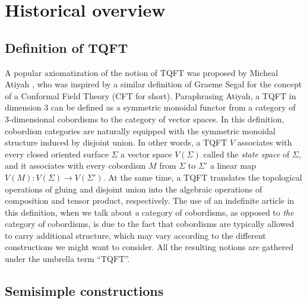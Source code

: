 \documentclass[a4paper,reqno]{amsart}
\theoremstyle{definition}
\theoremstyle{remark}
\renewcommand{\Sigma}{\varSigma}
\begin{document}
\section{Historical overview}\label{S:history}

\subsection*{Definition of TQFT}

A popular axiomatization of the notion of TQFT was proposed by Micheal Atiyah \cite{A88}, who was inspired by a similar definition of Graeme Segal \cite{S88} for the concept of a Conformal Field Theory (CFT for short). Paraphrasing Atiyah, a TQFT in dimension 3 can be defined as a symmetric monoidal functor from a category of 3-dimensional cobordisms to the category of vector spaces. In this definition, cobordism categories are naturally equipped with the symmetric monoidal structure induced by disjoint union. In other words, a TQFT $V$ associates with every closed oriented surface $\Sigma$ a vector space $V(\Sigma)$ called the \textit{state space} of $\Sigma$, and it associates with every cobordism $M$ from $\Sigma$ to $\Sigma'$ a linear map $V(M) : V(\Sigma) \to V(\Sigma')$. At the same time, a TQFT translates the topological operations of gluing and disjoint union into the algebraic operations of composition and tensor product, respectively. The use of an indefinite article in this definition, when we talk about \textit{a} category of cobordisms, as opposed to \textit{the} category of cobordisms, is due to the fact that cobordisms are typically allowed to carry additional structure, which may vary according to the different constructions we might want to consider. All the resulting notions are gathered under the umbrella term ``TQFT''.

\subsection*{Semisimple constructions}
\end{document}
